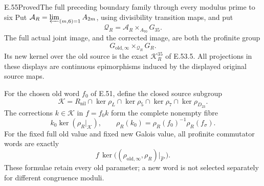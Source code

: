 \begin{statement}{E.55}{Proved}{The full preceding boundary family through every modulus prime to six}
Put $\mathcal A_R=\varprojlim_{(m,6)=1}A_{2m}$,
using divisibility transition maps, and put
\[
 \mathcal Q_R=\mathcal A_R\mathbin{\times_{A_{70}}}G_{35}.
 \tag{E.55.4}
\]
The full actual joint image, and the corrected image,
are both the profinite group
\[
       G_{\mathrm{old},\infty}
                   \mathbin{\times_{\mathcal Q_R}}G_R.
 \tag{E.55.5}
\]
Its new kernel over the old source is the exact
$\mathcal K_R^{35}$ of E.53.5.
All projections in these displays are continuous
epimorphisms induced by the displayed original
source maps.

For the chosen old word $f_0$ of E.51, define the
closed source subgroup
\[
 \mathscr K=R_{\mathrm{nil}}\cap\ker\rho_L
       \cap\ker\rho_5\cap\ker\rho_7
       \cap\ker\rho_{D_{23}}.
 \tag{E.55.6}
\]
The corrections $k\in\mathscr K$ in $f=f_0k$ form
the complete nonempty fibre
\[
 k_0\ker(\rho_R|_{\mathscr K}),\qquad
 \rho_R(k_0)=\rho_R(f_0)^{-1}\rho_R(f_\sigma).
 \tag{E.55.7}
\]
For the fixed full old value and fixed new Galois
value, all profinite commutator words are exactly
\[
 f\,\ker\bigl((\rho_{\mathrm{old},\infty},\rho_R)
                                          |_{\widehat F'}\bigr).
 \tag{E.55.8}
\]
These formulae retain every old parameter; a new
word is not selected separately for different
congruence moduli.
\end{statement}

